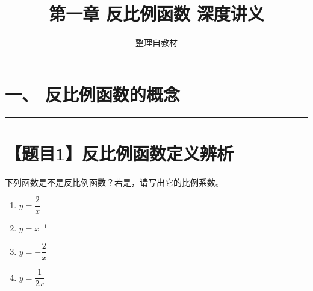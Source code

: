 \documentclass[UTF8]{ctexart}
\newcommand{\problemrule}{\noindent\rule{\textwidth}{1.5pt}\vspace{-0.8em}}
\begin{document}
\title{\textbf{ 第一章 反比例函数 深度讲义}}
\author{整理自教材}
\date{}
\maketitle

\section*{一、 反比例函数的概念}

\problemrule
\section*{【题目1】反比例函数定义辨析}
下列函数是不是反比例函数？若是，请写出它的比例系数。
\begin{enumerate}[label=(\arabic*), itemsep=5pt]
    \item $y = \dfrac{2}{x}$
    \item $y = x^{-1}$
    \item $y = -\dfrac{2}{x}$
    \item $y = \dfrac{1}{2x}$
\end{enumerate}
\end{document}

